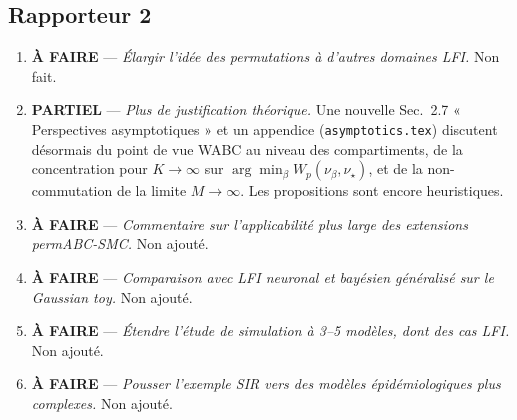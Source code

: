 \documentclass[11pt]{article}
\begin{document}
\subsection*{Rapporteur 2}
\begin{enumerate}[leftmargin=*]
    \item \textcolor{red!70!black}{\textbf{À FAIRE}} --- \emph{Élargir l'idée des permutations à
    d'autres domaines LFI.} Non fait.
    \item \textcolor{orange!85!black}{\textbf{PARTIEL}} --- \emph{Plus de justification théorique.}
    Une nouvelle Sec.~2.7 « Perspectives asymptotiques » et un appendice
    (\texttt{asymptotics.tex}) discutent désormais du point de vue WABC au niveau des
    compartiments, de la concentration pour $K\to\infty$ sur
    $\arg\min_\beta W_p(\nu_\beta,\nu_\star)$, et de la non-commutation de la limite $M\to\infty$.
    Les propositions sont encore heuristiques.
    \item \textcolor{red!70!black}{\textbf{À FAIRE}} --- \emph{Commentaire sur l'applicabilité plus
    large des extensions permABC-SMC.} Non ajouté.
    \item \textcolor{red!70!black}{\textbf{À FAIRE}} --- \emph{Comparaison avec LFI neuronal et
    bayésien généralisé sur le Gaussian toy.} Non ajouté.
    \item \textcolor{red!70!black}{\textbf{À FAIRE}} --- \emph{Étendre l'étude de simulation à 3--5
    modèles, dont des cas LFI.} Non ajouté.
    \item \textcolor{red!70!black}{\textbf{À FAIRE}} --- \emph{Pousser l'exemple SIR vers des
    modèles épidémiologiques plus complexes.} Non ajouté.
\end{enumerate}
\end{document}
